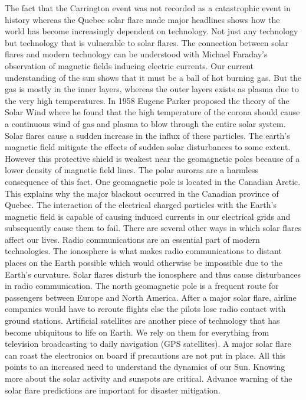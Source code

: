 \documentclass{../template/texnote}
\begin{document}
The fact that the Carrington event was not recorded as a catastrophic event in history whereas the Quebec solar flare made major headlines shows how the world has become increasingly dependent on technology. Not just any technology but technology that is vulnerable to solar flares. The connection between solar flares and modern technology can be understood with Michael Faraday's observation of magnetic fields inducing electric currents. 
Our current understanding of the sun shows that it must be a ball of hot burning gas. But the gas is mostly in the inner layers, whereas the outer layers exists as plasma due to the very high temperatures. In 1958 Eugene Parker proposed the theory of the Solar Wind where he found that the high temperature of the corona should cause a continuous wind of gas and plasma to blow through the entire solar system. Solar flares cause a sudden increase in the influx of these particles. 
The earth’s magnetic field mitigate the effects of sudden solar disturbances to some extent. However this protective shield is weakest near the geomagnetic poles because of a lower density of magnetic field lines. The polar auroras are a harmless consequence of this fact. 
One geomagnetic pole is located in the Canadian Arctic. This explains why the major blackout occurred in the Canadian province of Quebec. The interaction of the electrical charged particles with the Earth's magnetic field is capable of causing induced currents in our electrical grids and subsequently cause them to fail.
There are several other ways in which solar flares affect our lives. Radio communications are an essential part of modern technologies. The ionosphere is what makes radio communications to distant places on the Earth possible which would otherwise be impossible due to the Earth's curvature. Solar flares disturb the ionosphere and thus cause disturbances in radio communication. The north geomagnetic pole is a frequent route for passengers between Europe and North America. After a major solar flare, airline companies would have to reroute flights else the pilots lose radio contact with ground stations. 
Artificial satellites are another piece of technology that has become ubiquitous to life on Earth. We rely on them for everything from television broadcasting to daily navigation (GPS satellites). A major solar flare can roast the electronics on board if precautions are not put in place.
All this points to an increased need to understand the dynamics of our Sun. Knowing more about the solar activity and sunspots are critical. Advance warning of the solar flare predictions are important for disaster mitigation. 
\end{document}
